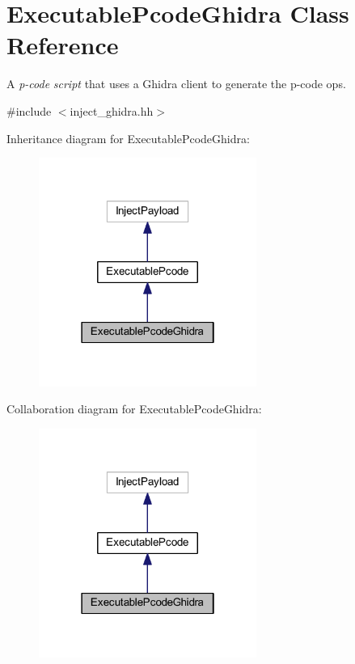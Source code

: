 \hypertarget{class_executable_pcode_ghidra}{}\section{Executable\+Pcode\+Ghidra Class Reference}
\label{class_executable_pcode_ghidra}


A {\itshape p-\/code} {\itshape script} that uses a Ghidra client to generate the p-\/code ops.  




{\ttfamily \#include $<$inject\+\_\+ghidra.\+hh$>$}



Inheritance diagram for Executable\+Pcode\+Ghidra\+:
\nopagebreak
\begin{figure}[H]
\begin{center}
\leavevmode
\includegraphics[width=202pt]{class_executable_pcode_ghidra__inherit__graph}
\end{center}
\end{figure}


Collaboration diagram for Executable\+Pcode\+Ghidra\+:
\nopagebreak
\begin{figure}[H]
\begin{center}
\leavevmode
\includegraphics[width=202pt]{class_executable_pcode_ghidra__coll__graph}
\end{center}
\end{figure}
